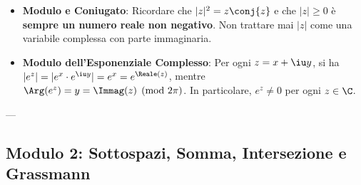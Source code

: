 \begin{esame}
\begin{itemize}
    \item \textbf{Modulo e Coniugato}: Ricordare che $|z|^2 = z \conj{z}$ e che $|z| \ge 0$ è \textbf{sempre un numero reale non negativo}. Non trattare mai $|z|$ come una variabile complessa con parte immaginaria.
    \item \textbf{Modulo dell'Esponenziale Complesso}: Per ogni $z = x + \iu y$, si ha $|e^z| = |e^x \cdot e^{\iu y}| = e^x = e^{\Reale(z)}$, mentre $\Arg(e^z) = y = \Immag(z) \pmod{2\pi}$. In particolare, $e^z \neq 0$ per ogni $z \in \C$.
\end{itemize}
\end{esame}

---

\subsection{Modulo 2: Sottospazi, Somma, Intersezione e Grassmann}

